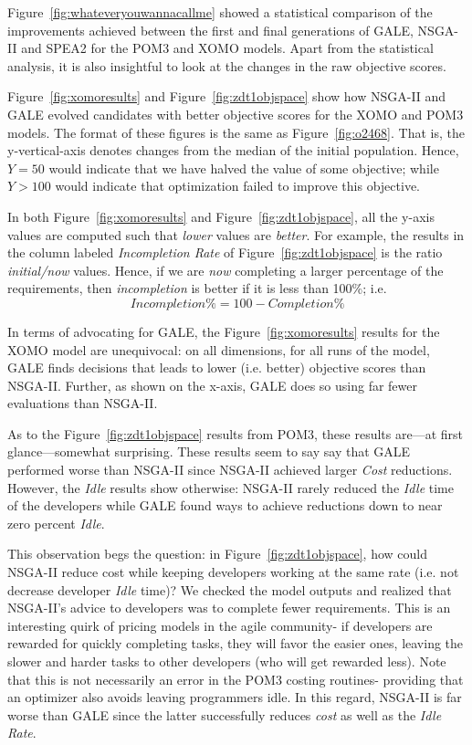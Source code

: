 \documentclass[10pt,journal,compsoc]{IEEEtran}
\newcommand{\fig}[1]{Figure~\ref{fig:#1}}
\newenvironment{changed}{\par}{\par}
\begin{document}
\fig{whateveryouwannacallme} showed a statistical comparison of the improvements
achieved between the first and final generations
of GALE, NSGA-II and SPEA2 for the POM3 and XOMO models.
Apart from the statistical analysis, it is also insightful
to look at the changes in the raw objective scores.

\fig{xomoresults} and 
\fig{zdt1objspace} show  how NSGA-II and GALE evolved candidates
with better objective scores for the XOMO and POM3 models.
The format of these figures is the same as \fig{o2468}.
That is,
the y-vertical-axis denotes
changes from the median of the initial population.
Hence, $Y=50$ would indicate that we have halved the value of some objective;
while  $Y \gt 100$ would indicate that optimization failed to improve this objective.

In both \fig{xomoresults} and \fig{zdt1objspace}, all 
the y-axis values are computed such that {\em lower}
values are {\em better}. For example, the results in the column
labeled {\em Incompletion Rate} of \fig{zdt1objspace}
is the ratio {\em initial/now} values. Hence, if we are {\em now} completing a larger
percentage of the requirements, then {\em incompletion} is better if it is
less than 100\%; i.e. \[\mathit{Incompletion}\% = 100 - \mathit{Completion}\%\]


\begin{changed}
\noindent 
In terms of advocating for GALE,
the \fig{xomoresults} results for the XOMO model
are unequivocal: on all dimensions, for all runs of the model,
GALE finds decisions that leads to lower  (i.e.  better) objective scores than NSGA-II.
Further, as shown on the x-axis, GALE does so using far fewer evaluations than NSGA-II.
\end{changed}

As to the \fig{zdt1objspace} results from POM3, these results are---at first glance---somewhat surprising.
These results seem to say  say that GALE
performed worse than NSGA-II since NSGA-II achieved larger
{\em Cost} reductions. However, the {\em Idle}
results  show otherwise:
 NSGA-II rarely reduced
the {\em Idle} time of the developers  while GALE
found ways to achieve reductions down to near zero percent {\em Idle}.

This observation begs the question: in \fig{zdt1objspace},
how could NSGA-II reduce cost while keeping developers working at the same rate
(i.e. not decrease developer {\em
  Idle} time)?  We checked the model outputs
and realized that  NSGA-II's advice to developers was to
complete
fewer requirements. This is an interesting quirk of pricing models in the agile
community- if developers are rewarded for quickly completing tasks, they will
favor the easier ones, leaving the slower and harder tasks to other developers (who
will get rewarded less). 
Note that this is not necessarily an error in the  POM3 costing routines- providing 
that an optimizer also avoids leaving programmers idle.
In this regard, NSGA-II is far worse than GALE since the latter
successfully reduces {\em cost} as well as the {\em Idle Rate}.
\end{document}
